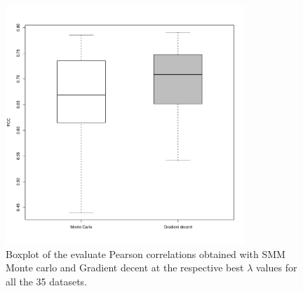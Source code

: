 \documentclass{bioinfo}
\begin{document}
\begin{application}
\begin{figure}[!tpb]
\centerline{\includegraphics[width=9cm]{fig/boxplot.pdf}}
\caption{Boxplot of the evaluate Pearson correlations obtained with SMM Monte carlo and Gradient decent at the respective best $\lambda$ values for all the 35 datasets.}
\label{fig:06}
\end{figure}




\end{application}
\end{document}
